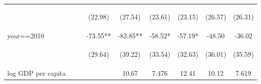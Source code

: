 \begin{landscape}
\begin{table}[htpb!]
\begin{center}
\begin{tabular}{lcccccccc}
	& \begin{footnotesize}		\end{footnotesize} & \begin{footnotesize}		\end{footnotesize} & \begin{footnotesize}	(22.98)	\end{footnotesize} & \begin{footnotesize}	(27.54)	\end{footnotesize} & \begin{footnotesize}	(23.61)	\end{footnotesize} & \begin{footnotesize}	(23.15)	\end{footnotesize} & \begin{footnotesize}	(26.57)	\end{footnotesize} & \begin{footnotesize}	(26.31)	\end{footnotesize} \\	
year==2010	&		&		&	-73.55**	&	-83.85**	&	-58.52*	&	-57.19*	&	-48.50	&	-36.02	\\	
	& \begin{footnotesize}		\end{footnotesize} & \begin{footnotesize}		\end{footnotesize} & \begin{footnotesize}	(29.64)	\end{footnotesize} & \begin{footnotesize}	(39.22)	\end{footnotesize} & \begin{footnotesize}	(33.54)	\end{footnotesize} & \begin{footnotesize}	(32.63)	\end{footnotesize} & \begin{footnotesize}	(36.01)	\end{footnotesize} & \begin{footnotesize}	(35.59)	\end{footnotesize} \\	
log GDP per capita	&		&		&		&	10.67	&	7.476	&	12.41	&	10.12	&	7.619	\\	

\end{tabular}
\end{center}
\end{table}
\end{landscape}
